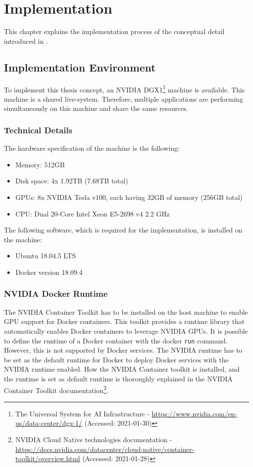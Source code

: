 \chapter{Implementation}
\label{chap:06_implementation}

This chapter explains the implementation process of the conceptual detail introduced in .


\section{Implementation Environment}
To implement this thesis concept, an NVIDIA DGX1\footnote{The Universal System for AI Infrastructure - \url{https://www.nvidia.com/en-us/data-center/dgx-1/} (Accessed: 2021-01-30)} machine is available. 
This machine is a shared live-system. Therefore, multiple applications are performing simultaneously on this machine and share the same resources.


\subsection{Technical Details}
The hardware specification of the machine is the following:
\begin{itemize}
\item Memory: 512GB
\item Disk space: 4x 1.92TB (7.68TB total)
\item GPUs: 8x NVIDIA Tesla v100, each having 32GB of memory (256GB total)
\item CPU: Dual 20-Core Intel Xeon E5-2698 v4 2.2 GHz
\end{itemize}


The following software, which is required for the implementation, is installed on the machine:
\begin{itemize}
\item Ubuntu 18.04.5 LTS
\item Docker version 18.09.4
\end{itemize}


\subsection{NVIDIA Docker Runtime}
The NVIDIA Container Toolkit has to be installed on the host machine to enable GPU support for Docker containers. This toolkit provides a runtime library that automatically enables Docker containers to leverage NVIDIA GPUs.
It is possible to define the runtime of a Docker container with the docker \texttt{run} command. However, this is not supported by Docker services. The NVIDIA runtime has to be set as the default runtime for Docker to deploy Docker services with the NVIDIA runtime enabled.
How the NVIDIA Container toolkit is installed, and the runtime is set as default runtime is thoroughly explained in the NVIDIA Container Toolkit documentation\footnote{NVIDIA Cloud Native technologies documentation - \url{https://docs.nvidia.com/datacenter/cloud-native/container-toolkit/overview.html} (Accessed: 2021-01-28)}.

